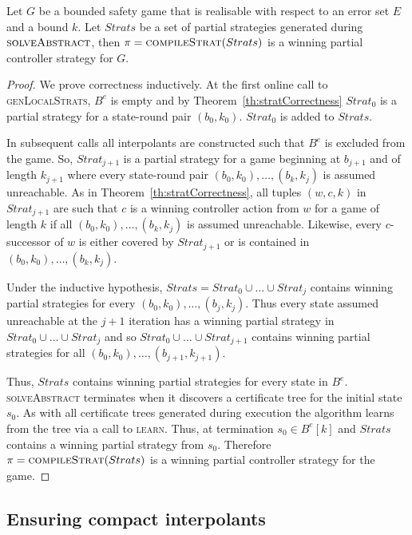 \begin{theorem}
    Let $G$ be a bounded safety game that is realisable with respect to an error set $E$ and a bound $k$. Let $Strats$ be a set of partial strategies generated during $\textsc{solveAbstract}$, then $\pi = \textsc{compileStrat}(Strats)$ is a winning partial controller strategy for $G$.
\end{theorem}
\begin{proof}
    We prove correctness inductively. At the first online call to \textsc{genLocalStrats}, $B^e$ is empty and by Theorem~\ref{th:stratCorrectness} $Strat_0$ is a partial strategy for a state-round pair $(b_0, k_0)$. $Strat_0$ is added to $Strats$.
    
    In subsequent calls all interpolants are constructed such that $B^e$ is excluded from the game. So, $Strat_{j+1}$ is a partial strategy for a game beginning at $b_{j+1}$ and of length $k_{j+1}$ where every state-round pair $(b_0, k_0), \ldots, (b_k, k_j)$ is assumed unreachable. As in Theorem~\ref{th:stratCorrectness}, all tuples $(w, c, k)$ in $Strat_{j+1}$ are such that $c$ is a winning controller action from $w$ for a game of length $k$ if all $(b_0, k_0), \ldots, (b_k, k_j)$ is assumed unreachable. Likewise, every $c$-successor of $w$ is either covered by $Strat_{j+1}$ or is contained in $(b_0, k_0), \ldots, (b_k, k_j)$.

    Under the inductive hypothesis, $Strats = Strat_0 \cup \ldots \cup Strat_j$ contains winning partial strategies for every $(b_0, k_0), \ldots, (b_j, k_j)$. Thus every state assumed unreachable at the $j+1$ iteration has a winning partial strategy in $Strat_0 \cup \ldots \cup Strat_j$ and so $Strat_0 \cup \ldots \cup Strat_{j+1}$ contains winning partial strategies for all $(b_0, k_0), \ldots, (b_{j+1}, k_{j+1})$.

    Thus, $Strats$ contains winning partial strategies for every state in $B^e$.  \textsc{solveAbstract} terminates when it discovers a certificate tree for the initial state $s_0$. As with all certificate trees generated during execution the algorithm learns from the tree via a call to \textsc{learn}. Thus, at termination $s_0 \in B^e[k]$ and $Strats$ contains a winning partial strategy from $s_0$. Therefore $\pi = \textsc{compileStrat}(Strats)$ is a winning partial controller strategy for the game.
\end{proof}

\subsection{Ensuring compact interpolants}

